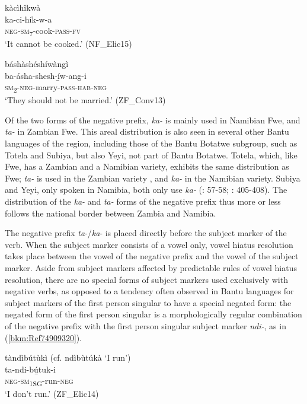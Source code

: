 \ea
\label{bkm:Ref505773692}
\glll kàcìhîkwà\\
ka-ci-hík-w-a\\
\textsc{neg}-\textsc{sm}\textsubscript{7}-cook-\textsc{pass}-\textsc{fv}\\
\glt ‘It cannot be cooked.’ (NF\_Elic15)
\z

\ea
\label{bkm:Ref505773694}
\glll báshàshéshíwàngì\\
ba-ásha-shesh-í̲w-ang-i\\
\textsc{sm}\textsubscript{2}-\textsc{neg}-marry-\textsc{pass}-\textsc{hab}-\textsc{neg}\\
\glt ‘They should not be married.’ (ZF\_Conv13)
\z

Of the two forms of the negative prefix, \textit{ka-} is mainly used in Namibian Fwe, and \textit{ta-} in Zambian Fwe. This areal distribution is also seen in several other Bantu languages of the region, including those of the Bantu Botatwe subgroup, such as Totela and Subiya, but also Yeyi, not part of Bantu Botatwe. Totela, which, like Fwe, has a Zambian and a Namibian variety, exhibits the same distribution as Fwe; \textit{ta-} is used in the Zambian variety \citep[82]{Crane2011}, and \textit{ka-} in the Namibian variety. Subiya and Yeyi, only spoken in Namibia, both only use \textit{ka-} (\citealt{Jacottet1896}: 57-58; \citealt{Seidel2008}: 405-408). The distribution of the \textit{ka-} and \textit{ta-} forms of the negative prefix thus more or less follows the national border between Zambia and Namibia.

The negative prefix \textit{ta}-/\textit{ka}- is placed directly before the subject marker of the verb. When the subject marker consists of a vowel only, vowel hiatus resolution takes place between the vowel of the negative prefix and the vowel of the subject marker. Aside from subject markers affected by predictable rules of vowel hiatus resolution, there are no special forms of subject markers used exclusively with negative verbs, as opposed to a tendency often observed in Bantu languages for subject markers of the first person singular to have a special negated form: the negated form of the first person singular is a morphologically regular combination of the negative prefix with the first person singular subject marker \textit{ndi-}, as in (\ref{bkm:Ref74909320}).

\ea
\label{bkm:Ref74909320}
tàndìbútùkì (cf. ndìbùtúkà ‘I run’)\\
\gll ta-ndi-bú̲tuk-i\\
\textsc{neg}-\textsc{sm}\textsubscript{1SG}-run-\textsc{neg}\\
\glt ‘I don’t run.’ (ZF\_Elic14)
\z

